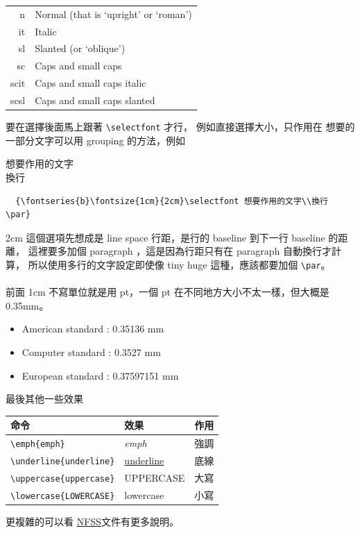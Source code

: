 \begin{itemize}
      \begin{center}
      \begin{tabular}{|rl|}
        \hline
        n  & Normal (that is ‘upright’ or ‘roman’) \\
        it & Italic \\
        sl & Slanted (or ‘oblique’) \\
        sc & Caps and small caps \\
        scit & Caps and small caps italic \\
        scsl & Caps and small caps slanted \\
        \hline
      \end{tabular}
      \end{center}
  \end{itemize}

  要在選擇後面馬上跟著 \verb=\selectfont= 才行， 例如直接選擇大小，只作用在
  想要的一部分文字可以用 grouping 的方法，例如

  {\fontsize{1cm}{2cm}\selectfont 想要作用的文字\\換行 \par}

  \begin{verbatim}
  {\fontseries{b}\fontsize{1cm}{2cm}\selectfont 想要作用的文字\\換行 \par}
  \end{verbatim}

  2cm 這個選項先想成是 line space 行距，是行的 baseline 到下一行 baseline 的距
  離， 這裡要多加個 paragraph ，這是因為行距只有在 paragraph 自動換行才計算，
  所以使用多行的文字設定即使像 tiny huge 這種，應該都要加個 \verb=\par=。
  \\\\
  前面 1cm 不寫單位就是用 pt，一個 pt 在不同地方大小不太一樣，但大概是 0.35mm。

  \begin{itemize}
    \item American standard : 0.35136 mm
    \item Computer standard : 0.3527 mm
    \item European standard : 0.37597151 mm
  \end{itemize}

  最後其他一些效果

  \begin{center}
    \begin{tabular}[t]{lll}
      命令 & 效果 & 作用 \\
      \hline
      \hline
      \verb=\emph{emph}= & \emph{emph} & 強調 \\
      \verb=\underline{underline}= & \underline{underline} & 底線  \\
      \verb=\uppercase{uppercase}= & \uppercase{uppercase} & 大寫  \\
      \verb=\lowercase{LOWERCASE}= & \lowercase{LOWERCASE} & 小寫  \\
    \end{tabular}
  \end{center}
  更複雜的可以看
  \href{https://www.latex-project.org/help/documentation/fntguide.pdf}
  {\LaTeXe{} NFSS}文件有更多說明。

